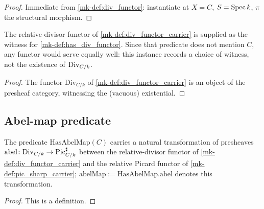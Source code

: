 \begin{proof}
  \leanok{}
  Immediate from \ref{mk-def:div_functor}: instantiate at
  \(X = C\), \(S = \operatorname{Spec} k\), \(\pi\) the structural morphism.
\end{proof}

\begin{definition}\label{mk-def:inst_has_div_functor}
  \leanok

  The relative-divisor functor of \ref{mk-def:div_functor_carrier} is supplied as
  the witness for \ref{mk-def:has_div_functor}. Since that predicate does not
  mention \(C\), any functor would serve equally well: this instance records a
  choice of witness, not the existence of \(\operatorname{Div}_{C/k}\).
\end{definition}

\begin{proof}
  \leanok{}
  The functor \(\mathrm{Div}_{C/k}\) of \ref{mk-def:div_functor_carrier} is an
  object of the presheaf category, witnessing the (vacuous) existential.
\end{proof}

\subsection{Abel-map predicate}
\label{mk-subsec:fga_pic_abel_map_carrier}

\begin{definition}\label{mk-def:has_abel_map}
  \leanok

  The predicate \(\mathrm{HasAbelMap}(C)\) carries a natural
  transformation of presheaves \(\mathrm{abel} \colon \mathrm{Div}_{C/k}
  \to \operatorname{Pic}^\sharp_{C/k}\) between the relative-divisor functor of
  \ref{mk-def:div_functor_carrier} and the relative Picard functor of
  \ref{mk-def:pic_sharp_carrier}; \(\mathrm{abelMap} :=
  \mathrm{HasAbelMap.abel}\) denotes this transformation.
\end{definition}

\begin{proof}
  This is a definition.
\end{proof}


